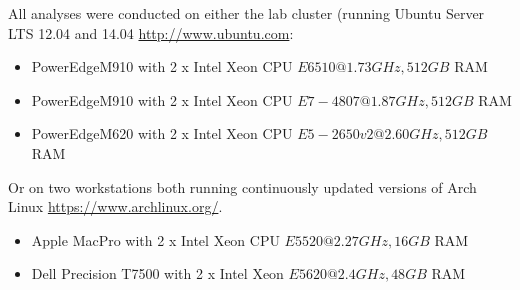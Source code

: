 All analyses were conducted on either the lab cluster (running Ubuntu Server LTS 12.04 and 14.04 \url{http://www.ubuntu.com}:
\begin{itemize} 
    \item PowerEdgeM910 with 2 x Intel Xeon CPU \(E6510 @ 1.73GHz, 512GB\) RAM
    \item PowerEdgeM910 with 2 x Intel Xeon CPU \(E7-4807 @ 1.87GHz, 512GB\) RAM
    \item PowerEdgeM620 with 2 x Intel Xeon CPU \(E5-2650 v2 @ 2.60GHz, 512GB\) RAM
\end{itemize}
Or on two workstations both running continuously updated versions of Arch Linux \url{https://www.archlinux.org/}.
\begin{itemize}
    \item Apple MacPro with 2 x Intel Xeon CPU \(E5520 @ 2.27GHz, 16GB\) RAM
    \item Dell Precision T7500 with 2 x Intel Xeon \(E5620 @ 2.4GHz, 48GB\) RAM
\end{itemize}

